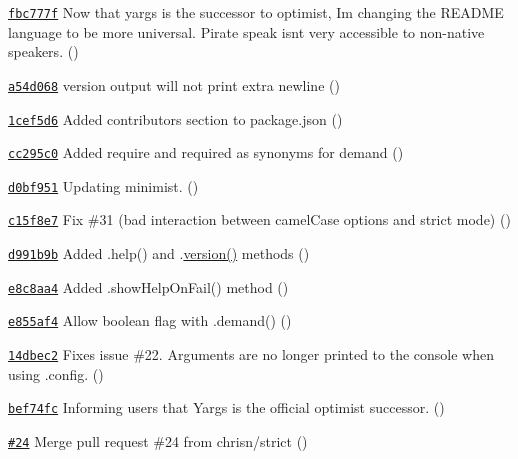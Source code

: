 \begin{DoxyItemize}
\item \href{https://github.com/bcoe/yargs/commit/fbc777f416eeefd37c84e44d27d7dfc7c1925721}{\tt fbc777f} Now that yargs is the successor to optimist, I\textquotesingle{}m changing the R\+E\+A\+D\+ME language to be more universal. Pirate speak isn\textquotesingle{}t very accessible to non-\/native speakers. ()
\item \href{https://github.com/bcoe/yargs/commit/a54d0682ae2efc2394d407ab171cc8a8bbd135ea}{\tt a54d068} version output will not print extra newline ()
\item \href{https://github.com/bcoe/yargs/commit/1cef5d62a9d6d61a3948a49574892e01932cc6ae}{\tt 1cef5d6} Added contributors section to package.\+json ()
\item \href{https://github.com/bcoe/yargs/commit/cc295c0a80a2de267e0155b60d315fc4b6f7c709}{\tt cc295c0} Added \textquotesingle{}require\textquotesingle{} and \textquotesingle{}required\textquotesingle{} as synonyms for \textquotesingle{}demand\textquotesingle{} ()
\item \href{https://github.com/bcoe/yargs/commit/d0bf951d949066b6280101ed606593d079ee15c8}{\tt d0bf951} Updating minimist. ()
\item \href{https://github.com/bcoe/yargs/commit/c15f8e7f245b261e542cf205ce4f4313630cbdb4}{\tt c15f8e7} Fix \#31 (bad interaction between camel\+Case options and strict mode) ()
\item \href{https://github.com/bcoe/yargs/commit/d991b9be687a68812dee1e3b185ba64b7778b82d}{\tt d991b9b} Added .help() and .\mbox{\hyperlink{namespacesetup_a2aa722b36a933088812b50ea79b97a5c}{version()}} methods ()
\item \href{https://github.com/bcoe/yargs/commit/e8c8aa46268379357cb11e9fc34b8c403037724b}{\tt e8c8aa4} Added .show\+Help\+On\+Fail() method ()
\item \href{https://github.com/bcoe/yargs/commit/e855af4a933ea966b5bbdd3c4c6397a4bac1a053}{\tt e855af4} Allow boolean flag with .demand() ()
\item \href{https://github.com/bcoe/yargs/commit/14dbec24fb7380683198e2b20c4deb8423e64bea}{\tt 14dbec2} Fixes issue \#22. Arguments are no longer printed to the console when using .config. ()
\item \href{https://github.com/bcoe/yargs/commit/bef74fcddc1544598a804f80d0a3728459f196bf}{\tt bef74fc} Informing users that Yargs is the official optimist successor. ()
\item \href{https://github.com/bcoe/yargs/pull/24}{\tt \#24} Merge pull request \#24 from chrisn/strict ()

\end{DoxyItemize}
